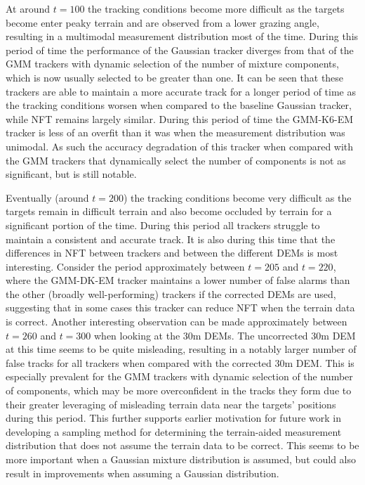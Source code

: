 \documentclass[journal]{IEEEtran}
\begin{document}
At around $t = 100$ the tracking conditions become more difficult as the targets become enter peaky terrain and are observed from a lower grazing angle, resulting in a multimodal measurement distribution most of the time. During this period of time the performance of the Gaussian tracker diverges from that of the GMM trackers with dynamic selection of the number of mixture components, which is now usually selected to be greater than one. It can be seen that these trackers are able to maintain a more accurate track for a longer period of time as the tracking conditions worsen when compared to the baseline Gaussian tracker, while NFT remains largely similar. During this period of time the GMM-K6-EM tracker is less of an overfit than it was when the measurement distribution was unimodal. As such the accuracy degradation of this tracker when compared with the GMM trackers that dynamically select the number of components is not as significant, but is still notable.

Eventually (around $t = 200$) the tracking conditions become very difficult as the targets remain in difficult terrain and also become occluded by terrain for a significant portion of the time. During this period all trackers struggle to maintain a consistent and accurate track. It is also during this time that the differences in NFT between trackers and between the different DEMs is most interesting. Consider the period approximately between $t = 205$ and $t = 220$, where the GMM-DK-EM tracker maintains a lower number of false alarms than the other (broadly well-performing) trackers if the corrected DEMs are used, suggesting that in some cases this tracker can reduce NFT when the terrain data is correct. Another interesting observation can be made approximately between $t = 260$ and $t = 300$ when looking at the 30m DEMs. The uncorrected 30m DEM at this time seems to be quite misleading, resulting in a notably larger number of false tracks for all trackers when compared with the corrected 30m DEM. This is especially prevalent for the GMM trackers with dynamic selection of the number of components, which may be more overconfident in the tracks they form due to their greater leveraging of misleading terrain data near the targets' positions during this period. This further supports earlier motivation for future work in developing a sampling method for determining the terrain-aided measurement distribution that does not assume the terrain data to be correct. This seems to be more important when a Gaussian mixture distribution is assumed, but could also result in improvements when assuming a Gaussian distribution.
\end{document}
